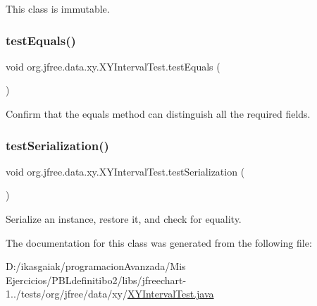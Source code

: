 This class is immutable. \mbox{\label{classorg_1_1jfree_1_1data_1_1xy_1_1_x_y_interval_test_a5b4167a9be85014fcebe8e5264ee4c6b}} 
\subsubsection{\texorpdfstring{test\+Equals()}{testEquals()}}
{\footnotesize\ttfamily void org.\+jfree.\+data.\+xy.\+X\+Y\+Interval\+Test.\+test\+Equals (\begin{DoxyParamCaption}{ }\end{DoxyParamCaption})}

Confirm that the equals method can distinguish all the required fields. \mbox{\label{classorg_1_1jfree_1_1data_1_1xy_1_1_x_y_interval_test_abff95d6aae698d1bc45ef0bebcdacd0a}} 
\subsubsection{\texorpdfstring{test\+Serialization()}{testSerialization()}}
{\footnotesize\ttfamily void org.\+jfree.\+data.\+xy.\+X\+Y\+Interval\+Test.\+test\+Serialization (\begin{DoxyParamCaption}{ }\end{DoxyParamCaption})}

Serialize an instance, restore it, and check for equality. 

The documentation for this class was generated from the following file\+:\begin{DoxyCompactItemize}
\item 
D\+:/ikasgaiak/programacion\+Avanzada/\+Mis Ejercicios/\+P\+B\+Ldefinitibo2/libs/jfreechart-\/1../tests/org/jfree/data/xy/\mbox{\hyperlink{_x_y_interval_test_8java}{X\+Y\+Interval\+Test.\+java}}\end{DoxyCompactItemize}
